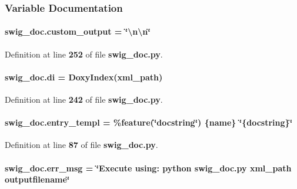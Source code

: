 \subsubsection{Variable Documentation}
\paragraph[{custom\+\_\+output}]{\setlength{\rightskip}{0pt plus 5cm}swig\+\_\+doc.\+custom\+\_\+output = \char`\"{}\textbackslash{}n\textbackslash{}n\char`\"{}}\label{namespaceswig__doc_a27bf98ba34b99d2f89716f8f0ac68590}


Definition at line {\bf 252} of file {\bf swig\+\_\+doc.\+py}.

\paragraph[{di}]{\setlength{\rightskip}{0pt plus 5cm}swig\+\_\+doc.\+di = Doxy\+Index({\bf xml\+\_\+path})}\label{namespaceswig__doc_a3c76c60b88c0dc784de50a0d6430358b}


Definition at line {\bf 242} of file {\bf swig\+\_\+doc.\+py}.

\paragraph[{entry\+\_\+templ}]{ swig\+\_\+doc.\+entry\+\_\+templ = \textquotesingle{}\%feature(\char`\"{}docstring\char`\"{}) \{name\} \char`\"{}\{docstring\}\char`\"{}\textquotesingle{}}\label{namespaceswig__doc_adb48da1ee6012eb85e576de0404adb81}


Definition at line {\bf 87} of file {\bf swig\+\_\+doc.\+py}.

\paragraph[{err\+\_\+msg}]{ swig\+\_\+doc.\+err\+\_\+msg = \char`\"{}Execute using\+: python swig\+\_\+doc.\+py {\bf xml\+\_\+path} outputfilename\char`\"{}}\label{namespaceswig__doc_a06d45f19ee2c509dc59ade7ba97aba1a}


